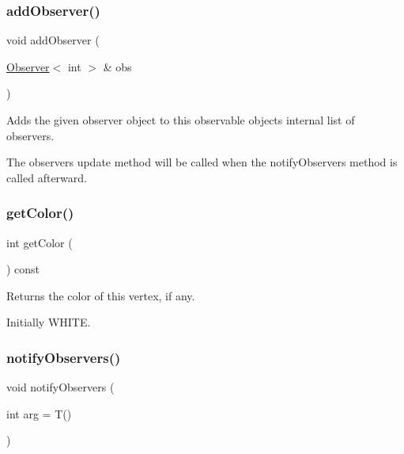 \subsubsection{\texorpdfstring{add\+Observer()}{addObserver()}\hspace{0.1cm}{\footnotesize\ttfamily [2/2]}}
{\footnotesize\ttfamily void add\+Observer (\begin{DoxyParamCaption}\item[{\mbox{\hyperlink{classObserver}{Observer}}$<$ int  $>$ \&}]{obs }\end{DoxyParamCaption})\hspace{0.3cm}{\ttfamily [inherited]}}



Adds the given observer object to this observable object\textquotesingle{}s internal list of observers. 

The observer\textquotesingle{}s update method will be called when the notify\+Observers method is called afterward. \mbox{\label{classVertexGen_a0a56fe92b545a9b650fe5cde9a756ea7}} 
\subsubsection{\texorpdfstring{get\+Color()}{getColor()}}
{\footnotesize\ttfamily int get\+Color (\begin{DoxyParamCaption}{ }\end{DoxyParamCaption}) const}



Returns the color of this vertex, if any. 

Initially W\+H\+I\+TE. \mbox{\label{classObservable_a337380718b992689248fac2927145c62}} 
\subsubsection{\texorpdfstring{notify\+Observers()}{notifyObservers()}}
{\footnotesize\ttfamily void notify\+Observers (\begin{DoxyParamCaption}\item[{int}]{arg = {\ttfamily T()} }\end{DoxyParamCaption})\hspace{0.3cm}{\ttfamily [inherited]}}



